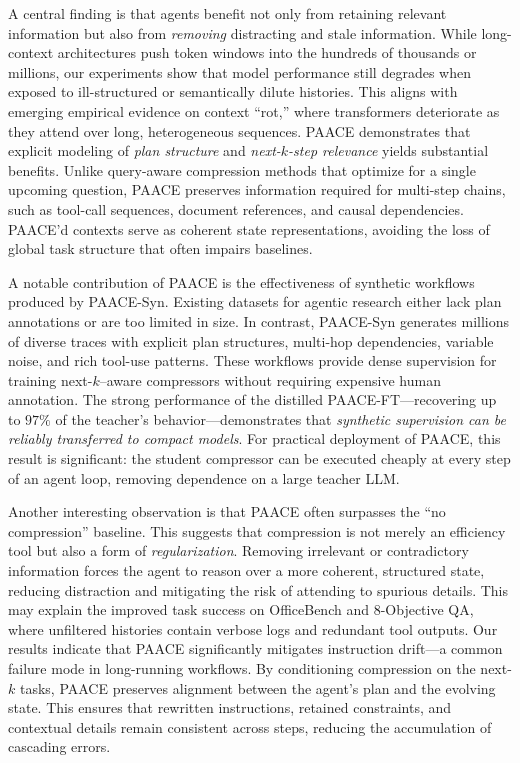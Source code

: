 \documentclass{article}
\theoremstyle{plain}
\theoremstyle{definition}
\theoremstyle{remark}
\begin{document}
A central finding is that agents benefit not only from retaining relevant information but also from \emph{removing} distracting and stale information. While long-context architectures push token windows into the hundreds of thousands or millions, our experiments show that model performance still degrades when exposed to ill-structured or semantically dilute histories. This aligns with emerging empirical evidence on context ``rot,'' where transformers deteriorate as they attend over long, heterogeneous sequences. PAACE demonstrates that explicit modeling of \emph{plan structure} and \emph{next-$k$-step relevance} yields substantial benefits. Unlike query-aware compression methods that optimize for a single upcoming question, PAACE preserves information required for multi-step chains, such as tool-call sequences, document references, and causal dependencies. PAACE'd contexts serve as coherent state representations, avoiding the loss of global task structure that often impairs baselines.

A notable contribution of PAACE is the effectiveness of synthetic workflows produced by PAACE-Syn. Existing datasets for agentic research either lack plan annotations or are too limited in size. In contrast, PAACE-Syn generates millions of diverse traces with explicit plan structures, multi-hop dependencies, variable noise, and rich tool-use patterns. These workflows provide dense supervision for training next-$k$--aware compressors without requiring expensive human annotation. The strong performance of the distilled PAACE-FT---recovering up to $97\%$ of the teacher's behavior---demonstrates that \emph{synthetic supervision can be reliably transferred to compact models}. For practical deployment of PAACE, this result is significant: the student compressor can be executed cheaply at every step of an agent loop, removing dependence on a large teacher LLM.

Another interesting observation is that PAACE often surpasses the ``no compression'' baseline. This suggests that compression is not merely an efficiency tool but also a form of \emph{regularization}. Removing irrelevant or contradictory information forces the agent to reason over a more coherent, structured state, reducing distraction and mitigating the risk of attending to spurious details. This may explain the improved task success on OfficeBench and 8-Objective QA, where unfiltered histories contain verbose logs and redundant tool outputs. Our results indicate that PAACE significantly mitigates instruction drift---a common failure mode in long-running workflows. By conditioning compression on the next-$k$ tasks, PAACE preserves alignment between the agent’s plan and the evolving state. This ensures that rewritten instructions, retained constraints, and contextual details remain consistent across steps, reducing the accumulation of cascading errors.
\end{document}
